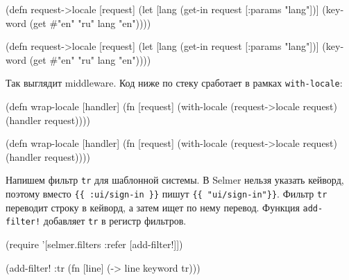 \ifnarrow

\begin{english}
  \begin{clojure}
(defn request->locale [request]
  (let [lang (get-in request
               [:params "lang"])]
    (keyword
      (get #{"en" "ru"} lang "en"))))
  \end{clojure}
\end{english}

\else

\begin{english}
  \begin{clojure}
(defn request->locale [request]
  (let [lang (get-in request [:params "lang"])]
    (keyword (get #{"en" "ru"} lang "en"))))
  \end{clojure}
\end{english}

\fi

Так выглядит middleware. Код ниже по стеку сработает в рамках
\verb|with-locale|:

\ifnarrow

\begin{english}
  \begin{clojure}
(defn wrap-locale [handler]
  (fn [request]
    (with-locale
      (request->locale request)
      (handler request))))
  \end{clojure}
\end{english}

\else

\begin{english}
  \begin{clojure}
(defn wrap-locale [handler]
  (fn [request]
    (with-locale (request->locale request)
      (handler request))))
  \end{clojure}
\end{english}

\fi

Напишем фильтр \verb|tr| для шаблонной системы. В Selmer нельзя указать кейворд,
поэтому вместо \verb|{{ :ui/sign-in }}| пишут \verb|{{ "ui/sign-in"}}|.  Фильтр
\verb|tr| переводит строку в кейворд, а затем ищет по нему перевод. Функция
\verb|add-filter!| добавляет \verb|tr| в регистр фильтров.

\ifnarrow

\begin{english}
  \begin{clojure}
(require
 '[selmer.filters :refer [add-filter!]])

(add-filter! :tr
 (fn [line]
   (-> line keyword tr)))
  \end{clojure}
\end{english}


